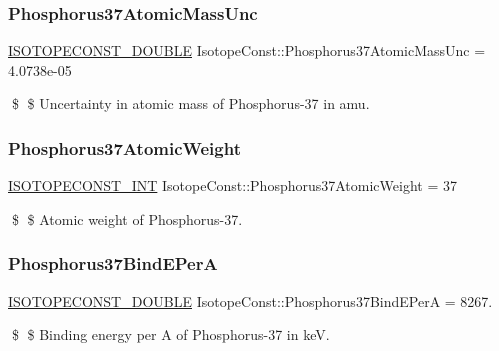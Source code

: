 \subsubsection{\texorpdfstring{Phosphorus37\+Atomic\+Mass\+Unc}{Phosphorus37AtomicMassUnc}}
{\footnotesize\ttfamily \mbox{\hyperlink{group___isotope_const-_macros_ga8f45a7272ce02c0b4c65c44636ed719a}{I\+S\+O\+T\+O\+P\+E\+C\+O\+N\+S\+T\+\_\+\+D\+O\+U\+B\+LE}} Isotope\+Const\+::\+Phosphorus37\+Atomic\+Mass\+Unc = 4.\+0738e-\/05}

\$ \$ Uncertainty in atomic mass of Phosphorus-\/37 in amu. \mbox{\label{group___isotope_const-_phosphorus-_p37_gaa149aaa051ea70c2ee5880a5201b870a}} 
\subsubsection{\texorpdfstring{Phosphorus37\+Atomic\+Weight}{Phosphorus37AtomicWeight}}
{\footnotesize\ttfamily \mbox{\hyperlink{group___isotope_const-_macros_ga5f18360b3e99483a35c32d789e62621c}{I\+S\+O\+T\+O\+P\+E\+C\+O\+N\+S\+T\+\_\+\+I\+NT}} Isotope\+Const\+::\+Phosphorus37\+Atomic\+Weight = 37}

\$ \$ Atomic weight of Phosphorus-\/37. \mbox{\label{group___isotope_const-_phosphorus-_p37_ga6483f54d042c8cd16d744396c415a073}} 
\subsubsection{\texorpdfstring{Phosphorus37\+Bind\+E\+PerA}{Phosphorus37BindEPerA}}
{\footnotesize\ttfamily \mbox{\hyperlink{group___isotope_const-_macros_ga8f45a7272ce02c0b4c65c44636ed719a}{I\+S\+O\+T\+O\+P\+E\+C\+O\+N\+S\+T\+\_\+\+D\+O\+U\+B\+LE}} Isotope\+Const\+::\+Phosphorus37\+Bind\+E\+PerA = 8267.}

\$ \$ Binding energy per A of Phosphorus-\/37 in keV. \mbox{\label{group___isotope_const-_phosphorus-_p37_ga3184fef29483ebb01dd8ed857c83530b}} 
